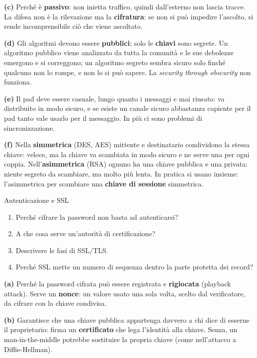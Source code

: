 \textbf{(c)} Perché è \textbf{passivo}: non inietta traffico, quindi dall'esterno non lascia tracce. La difesa non è la rilevazione ma la
\textbf{cifratura}: se non si può impedire l'ascolto, si rende incomprensibile ciò che viene ascoltato.

\textbf{(d)} Gli algoritmi devono essere \textbf{pubblici}; solo le \textbf{chiavi} sono segrete. Un algoritmo pubblico viene analizzato da
tutta la comunità e le sue debolezze emergono e si correggono; un algoritmo segreto sembra sicuro solo finché qualcuno non lo rompe, e non
lo si può sapere. La \emph{security through obscurity} non funziona.

\textbf{(e)} Il pad deve essere casuale, lungo quanto i messaggi e mai riusato: va distribuito in modo sicuro, e se esiste un canale sicuro
abbastanza capiente per il pad tanto vale usarlo per il messaggio. In più ci sono problemi di sincronizzazione.

\textbf{(f)} Nella \textbf{simmetrica} (DES, AES) mittente e destinatario condividono la stessa chiave: veloce, ma la chiave va scambiata in
modo sicuro e ne serve una per ogni coppia. Nell'\textbf{asimmetrica} (RSA) ognuno ha una chiave pubblica e una privata: niente segreto da
scambiare, ma molto più lenta. In pratica si usano insieme: l'asimmetrica per scambiare una \textbf{chiave di sessione} simmetrica.

\begin{esercizio}{Autenticazione e SSL}
\begin{enumerate}[label=(\alph*)]
    \item Perché cifrare la password non basta ad autenticarsi?
    \item A che cosa serve un'autorità di certificazione?
    \item Descrivere le fasi di SSL/TLS.
    \item Perché SSL mette un numero di sequenza dentro la parte protetta dei record?
\end{enumerate}
\end{esercizio}

\svolgimento
\textbf{(a)} Perché la password cifrata può essere registrata e \textbf{rigiocata} (playback attack). Serve un \textbf{nonce}: un valore
usato una sola volta, scelto dal verificatore, da cifrare con la chiave condivisa.

\textbf{(b)} Garantisce che una chiave pubblica appartenga davvero a chi dice di esserne il proprietario: firma un \textbf{certificato} che lega
l'identità alla chiave. Senza, un man-in-the-middle potrebbe sostituire la propria chiave (come nell'attacco a Diffie-Hellman).

